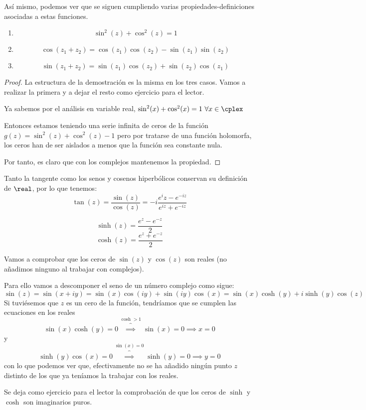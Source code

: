 \documentclass{apuntes}
\begin{document}
Así mismo, podemos ver que se siguen cumpliendo varias propiedades-definiciones asociadas a estas funciones.
\begin{enumerate}
\item
\[\sin^2(z)+\cos^2(z) =1\]
\item
\[\cos(z_1+z_2)=\cos(z_1)\cos(z_2)-\sin(z_1)\sin(z_2)\]
\item
\[\sin(z_1+z_2)=\sin(z_1)\cos(z_2)+\sin(z_2)\cos(z_1)\]
\end{enumerate}
\begin{proof}
La estructura de la demostración es la misma en los tres casos. Vamos a realizar la primera y a dejar el resto como ejercicio para el lector.

Ya sabemos por el análisis en variable real, $\sin^2(x)+\cos^2(x)=1 \ \forall x \in \cplex$

Entonces estamos teniendo una serie infinita de ceros de la función
$g(z)=\sin^2(z)+\cos^2(z)-1$
pero por tratarse de una función holomorfa, los ceros han de ser aislados a menos que la función sea constante nula.

Por tanto, es claro que con los complejos mantenemos la propiedad.
\end{proof}

Tanto la tangente como los senos y cosenos hiperbólicos conservan su definición de $\real$, por lo que tenemos:
\[\tan(z)=\frac{\sin(z)}{\cos(z)}=-i \frac{e^iz-e^{-iz}}{e^{iz}+e^{-iz}}\]

\[\sinh(z)=\frac{e^z-e^{-z}}{2}\]
\[\cosh(z)=\frac{e^z+e^{-z}}{2}\]

\begin{example}
Vamos a comprobar que los ceros de $\sin(z)$ y $\cos(z)$ son reales (no añadimos ninguno al trabajar con complejos).

Para ello vamos a descomponer el seno de un número complejo como sigue:
\[\sin(z)=\sin(x+iy)=\sin(x)\cos(iy)+\sin(iy)\cos(x)=\sin(x)\cosh(y)+i\sinh(y)\cos(z)\]
Si tuviésemos que $z$ es un cero de la función, tendríamos que se cumplen las ecuaciones en los reales
\[\sin(x)\cosh(y)=0 \overbrace{\implies}^{\cosh > 1} \sin(x)=0 \implies x = 0\]
y
\[\sinh(y)\cos(x)=0 \overbrace{\implies}^{\sin(x)=0} \sinh(y)=0 \implies y=0\]
con lo que podemos ver que, efectivamente no se ha añadido ningún punto $z$ distinto de los que ya teníamos la trabajar con los reales.
\end{example}

Se deja como ejercicio para el lector la comprobación de que los ceros de $\sinh$ y $\cosh$ son imaginarios puros.
\end{document}
